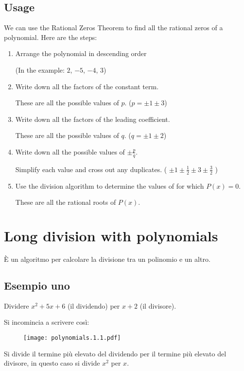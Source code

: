 \subsection{Usage}


We can use the Rational Zeros Theorem to find all the rational zeros of a polynomial. Here are the steps:
\begin{enumerate}
\item Arrange the polynomial in descending order\

(In the example: $2$, $-5$, $-4$, $3$)
\item Write down all the factors of the constant term.

These are all the possible values of $p$. ($p=\pm 1 \pm 3$)
\item Write down all the factors of the leading coefficient. 

These are all the possible values of $q$. ($q=\pm 1\pm 2$)
\item Write down all the possible values of $\pm \frac{p}{q}$.

Simplify each value and cross out any duplicates.  ( $\pm 1 \pm \frac{1}{2} \pm 3 \pm \frac{3}{2}$ )
\item Use the division algorithm to determine the values of for which $P(x) = 0$.

These are all the rational roots of $P(x)$.
\end{enumerate}


\section{Long division with polynomials}

\setcounter{equation}{0}
È un algoritmo per calcolare la divisione tra un polinomio e un altro.

\subsection{Esempio uno}

Dividere $x^2+5x+6$ (il dividendo) per $x+2$ (il divisore).

Si incomincia a scrivere così:

\begin{figure}[H]
\centering
\texttt{[image: polynomials.1.1.pdf]}
\end{figure}

Si divide il termine più elevato del dividendo per il termine più elevato del divisore, in questo caso si divide $x^2$ per $x$.

